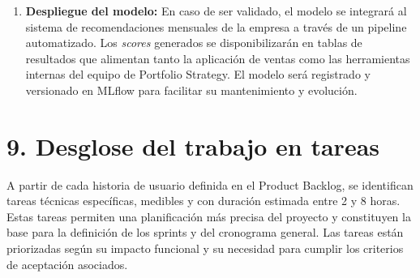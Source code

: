 \documentclass[
11pt, %
]{charter}
\begin{document}
\begin{enumerate}
\item \textbf{Despliegue del modelo:}
En caso de ser validado, el modelo se integrará al sistema de recomendaciones mensuales de la empresa a través de un pipeline automatizado. Los \textit{scores} generados se disponibilizarán en tablas de resultados que alimentan tanto la aplicación de ventas como las herramientas internas del equipo de Portfolio Strategy. El modelo será registrado y versionado en MLflow para facilitar su mantenimiento y evolución.
\end{enumerate}

\section{9. Desglose del trabajo en tareas}
\label{sec:wbs}

A partir de cada historia de usuario definida en el Product Backlog, se identifican tareas técnicas específicas, medibles y con duración estimada entre 2 y 8 horas. Estas tareas permiten una planificación más precisa del proyecto y constituyen la base para la definición de los sprints y del cronograma general. Las tareas están priorizadas según su impacto funcional y su necesidad para cumplir los criterios de aceptación asociados.
\end{document}
